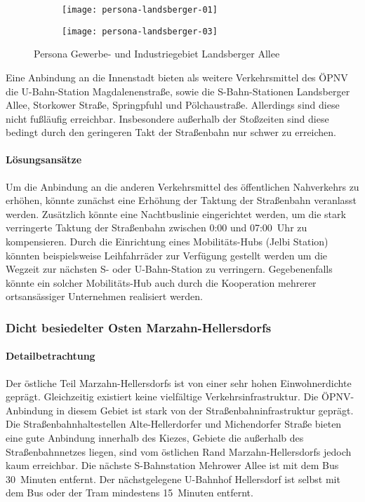 \begin{figure}
    \centering
    \begin{subfigure}{.5\textwidth}
        \centering
        \texttt{[image: persona-landsberger-01]}
    \end{subfigure}%
    \begin{subfigure}{.5\textwidth}
        \centering
        \texttt{[image: persona-landsberger-03]}
    \end{subfigure}
    \caption{Persona Gewerbe- und Industriegebiet Landsberger Allee}
    \label{persona-landsberger-allee}
\end{figure}

Eine Anbindung an die Innenstadt bieten als weitere Verkehrsmittel des ÖPNV die U-Bahn-Station Magdalenenstraße, sowie die S-Bahn-Stationen Landsberger Allee, Storkower Straße, Springpfuhl und Pölchaustraße. Allerdings sind diese nicht fußläufig erreichbar. Insbesondere außerhalb der Stoßzeiten sind diese bedingt durch den geringeren Takt der Straßenbahn nur schwer zu erreichen.

\paragraph{Lösungsansätze}

Um die Anbindung an die anderen Verkehrsmittel des öffentlichen Nahverkehrs zu erhöhen, könnte zunächst eine Erhöhung der Taktung der Straßenbahn veranlasst werden. Zusätzlich könnte eine Nachtbuslinie eingerichtet werden, um die stark verringerte Taktung der Straßenbahn zwischen 0:00 und 07:00~Uhr zu kompensieren. Durch die Einrichtung eines Mobilitäts-Hubs (Jelbi Station) könnten beispielsweise Leihfahrräder zur Verfügung gestellt werden um die Wegzeit zur nächsten S- oder U-Bahn-Station zu verringern. Gegebenenfalls könnte ein solcher Mobilitäts-Hub auch durch die Kooperation mehrerer ortsansässiger Unternehmen realisiert werden.

\subsubsection{Dicht besiedelter Osten Marzahn-Hellersdorfs}

\paragraph{Detailbetrachtung}

Der östliche Teil Marzahn-Hellersdorfs ist von einer sehr hohen Einwohnerdichte geprägt. Gleichzeitig existiert keine vielfältige Verkehrsinfrastruktur. Die ÖPNV-Anbindung in diesem Gebiet ist stark von der Straßenbahninfrastruktur geprägt. Die Straßenbahnhaltestellen Alte-Hellerdorfer und Michendorfer Straße bieten eine gute Anbindung innerhalb des Kiezes, Gebiete die außerhalb des Straßenbahnnetzes liegen, sind vom östlichen Rand Marzahn-Hellersdorfs jedoch kaum erreichbar. Die nächste S-Bahnstation Mehrower Allee ist mit dem Bus 30~Minuten entfernt. Der nächstgelegene U-Bahnhof Hellersdorf ist selbst mit dem Bus oder der Tram mindestens 15~Minuten entfernt.

